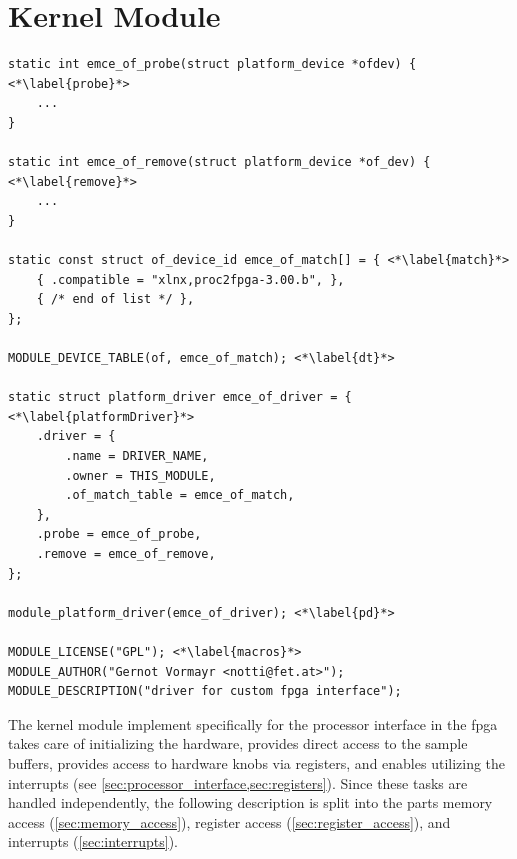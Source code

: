 \documentclass[12pt,a4paper,parskip=full,abstract=true,BCOR=12mm]{scrreprt}
\newcommand{\hack}{}
\begin{document}

\section{Kernel Module}
\label{sec:kernel_module}

\begin{lstlisting}[float=htb,caption={Basic elements of a platform driver module},label=src:pdriver,basicstyle=\hack\scriptsize]
static int emce_of_probe(struct platform_device *ofdev) { <*\label{probe}*>
	...
}

static int emce_of_remove(struct platform_device *of_dev) { <*\label{remove}*>
	...
}

static const struct of_device_id emce_of_match[] = { <*\label{match}*>
	{ .compatible = "xlnx,proc2fpga-3.00.b", },
	{ /* end of list */ },
};

MODULE_DEVICE_TABLE(of, emce_of_match); <*\label{dt}*>

static struct platform_driver emce_of_driver = { <*\label{platformDriver}*>
	.driver = {
		.name = DRIVER_NAME,
		.owner = THIS_MODULE,
		.of_match_table = emce_of_match,
	},
	.probe = emce_of_probe,
	.remove = emce_of_remove,
};

module_platform_driver(emce_of_driver); <*\label{pd}*>

MODULE_LICENSE("GPL"); <*\label{macros}*>
MODULE_AUTHOR("Gernot Vormayr <notti@fet.at>");
MODULE_DESCRIPTION("driver for custom fpga interface");
\end{lstlisting}

The kernel module implement specifically for the processor interface
in the \gls{fpga} takes care of initializing the hardware, provides
direct access to the sample buffers, provides access to hardware knobs
via registers, and enables utilizing the interrupts (see
\cref{sec:processor_interface,sec:registers}). Since these tasks are
handled independently, the following description is split into the parts
memory access (\cref{sec:memory_access}), register access
(\cref{sec:register_access}), and interrupts (\cref{sec:interrupts}).
\end{document}
